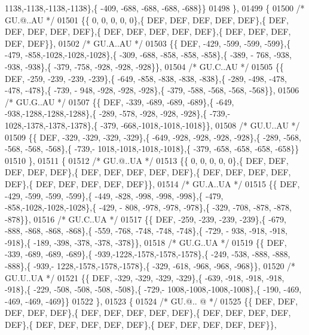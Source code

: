 \begin{DoxyCode}
      1138,-1138,-1138,-1138\},\{ -409, -688, -688, -688, -688\}\}
01498 \},
01499 \{
01500 \textcolor{comment}{/* GU.@..AU */}
01501 \{\{    0,    0,    0,    0,    0\},\{  DEF,  DEF,  DEF,  DEF,  DEF\},\{  DEF,  DEF,  DEF,  DEF,  DEF\},\{  DEF,  
      DEF,  DEF,  DEF,  DEF\},\{  DEF,  DEF,  DEF,  DEF,  DEF\}\},
01502 \textcolor{comment}{/* GU.A..AU */}
01503 \{\{  DEF, -429, -599, -599, -599\},\{ -479, -858,-1028,-1028,-1028\},\{ -309, -688, -858, -858, -858\},\{ -389, -
      768, -938, -938, -938\},\{ -379, -758, -928, -928, -928\}\},
01504 \textcolor{comment}{/* GU.C..AU */}
01505 \{\{  DEF, -259, -239, -239, -239\},\{ -649, -858, -838, -838, -838\},\{ -289, -498, -478, -478, -478\},\{ -739, -
      948, -928, -928, -928\},\{ -379, -588, -568, -568, -568\}\},
01506 \textcolor{comment}{/* GU.G..AU */}
01507 \{\{  DEF, -339, -689, -689, -689\},\{ -649, -938,-1288,-1288,-1288\},\{ -289, -578, -928, -928, -928\},\{ -739,-
      1028,-1378,-1378,-1378\},\{ -379, -668,-1018,-1018,-1018\}\},
01508 \textcolor{comment}{/* GU.U..AU */}
01509 \{\{  DEF, -329, -329, -329, -329\},\{ -649, -928, -928, -928, -928\},\{ -289, -568, -568, -568, -568\},\{ -739,-
      1018,-1018,-1018,-1018\},\{ -379, -658, -658, -658, -658\}\}
01510 \},
01511 \{
01512 \textcolor{comment}{/* GU.@..UA */}
01513 \{\{    0,    0,    0,    0,    0\},\{  DEF,  DEF,  DEF,  DEF,  DEF\},\{  DEF,  DEF,  DEF,  DEF,  DEF\},\{  DEF,  
      DEF,  DEF,  DEF,  DEF\},\{  DEF,  DEF,  DEF,  DEF,  DEF\}\},
01514 \textcolor{comment}{/* GU.A..UA */}
01515 \{\{  DEF, -429, -599, -599, -599\},\{ -449, -828, -998, -998, -998\},\{ -479, -858,-1028,-1028,-1028\},\{ -429, -
      808, -978, -978, -978\},\{ -329, -708, -878, -878, -878\}\},
01516 \textcolor{comment}{/* GU.C..UA */}
01517 \{\{  DEF, -259, -239, -239, -239\},\{ -679, -888, -868, -868, -868\},\{ -559, -768, -748, -748, -748\},\{ -729, -
      938, -918, -918, -918\},\{ -189, -398, -378, -378, -378\}\},
01518 \textcolor{comment}{/* GU.G..UA */}
01519 \{\{  DEF, -339, -689, -689, -689\},\{ -939,-1228,-1578,-1578,-1578\},\{ -249, -538, -888, -888, -888\},\{ -939,-
      1228,-1578,-1578,-1578\},\{ -329, -618, -968, -968, -968\}\},
01520 \textcolor{comment}{/* GU.U..UA */}
01521 \{\{  DEF, -329, -329, -329, -329\},\{ -639, -918, -918, -918, -918\},\{ -229, -508, -508, -508, -508\},\{ -729,-
      1008,-1008,-1008,-1008\},\{ -190, -469, -469, -469, -469\}\}
01522 \},
01523 \{
01524 \textcolor{comment}{/* GU.@.. @ */}
01525 \{\{  DEF,  DEF,  DEF,  DEF,  DEF\},\{  DEF,  DEF,  DEF,  DEF,  DEF\},\{  DEF,  DEF,  DEF,  DEF,  DEF\},\{  DEF,  
      DEF,  DEF,  DEF,  DEF\},\{  DEF,  DEF,  DEF,  DEF,  DEF\}\},

\end{DoxyCode}

